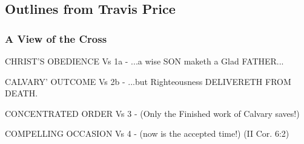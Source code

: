 \subsection{Outlines from Travis Price}


\subsubsection{A View of the Cross}



\begin{compactenum}[I.]
    \item CHRIST'S OBEDIENCE Vs 1a - ...a wise SON maketh a Glad FATHER...
    \item CALVARY' OUTCOME Vs 2b - ...but Righteousness DELIVERETH FROM DEATH.
    \item CONCENTRATED ORDER Vs 3 - (Only the Finished work of Calvary saves!)
    \item COMPELLING OCCASION Vs 4 - (now is the accepted time!) (II Cor. 6:2)
\end{compactenum}




